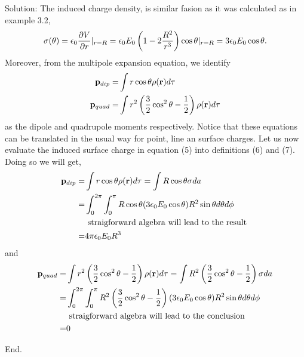 Solution: The induced charge density, is similar fasion as it was calculated as in example 3.2,
\begin{equation}
\sigma(\theta)=\epsilon_0\frac{\partial V}{\partial r}|_{r=R} = \epsilon_0E_0\left( 1-2\frac{R^2}{r^3} \right)\cos\theta |_{r=R} = 3\epsilon_0E_0\cos\theta.
\end{equation}
Moreover, from the multipole expansion equation, we identify 
\begin{align}
	\mathbf{p}_{dip} =& \int r\cos\theta\rho(\mathbf{r})d\tau\\
	\mathbf{p}_{quad} =& \int r^2\left(\frac{3}{2}\cos^2\theta-\frac{1}{2}\right)\rho(\mathbf{r})d\tau
\end{align}
as the dipole and quadrupole moments respectively. Notice that these equations can be translated in the usual way for point, line an surface charges. Let us now evaluate the induced surface charge in equation (5) into definitions (6) and (7). Doing so we will get,
\begin{align*}
\mathbf{p}_{dip} =& \int r\cos\theta\rho(\mathbf{r})d\tau = \int R\cos\theta\sigma da \\
			=& \int_0^{2\pi} \int_0^\pi 
			R\cos\theta (3\epsilon_0E_0\cos\theta) R^2\sin\theta d\theta d\phi\\
			& \text{ straigforward algebra will lead to the result }\\
			=& 4\pi\epsilon_0E_0R^3
\end{align*}
and
\begin{align*}
\mathbf{p}_{quad} =&	\int r^2\left(\frac{3}{2}\cos^2\theta-\frac{1}{2}\right)\rho(\mathbf{r})d\tau 
			= \int R^2\left(\frac{3}{2}\cos^2\theta-\frac{1}{2}\right)\sigma da \\
			=& \int_0^{2\pi} \int_0^\pi 
			R^2\left(\frac{3}{2}\cos^2\theta-\frac{1}{2}\right)
			(3\epsilon_0E_0\cos\theta) R^2\sin\theta d\theta d\phi\\
			& \text{ straigforward algebra will lead to the conclusion }\\
			=& 0			
\end{align*}


End.

